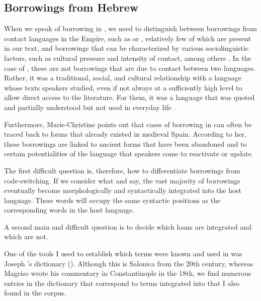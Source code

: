 \documentclass[output=paper,colorlinks,citecolor=brown,babel,arabicfont]{langscibook}
\begin{document}
\subsection{Borrowings from Hebrew}\label{ch3.7.ss.3.1}

When we speak of borrowing in , we need to distinguish between borrowings from contact languages in the  Empire, such as  or , relatively few of which are present in our text, and borrowings that can be characterized by various sociolinguistic factors, such as cultural pressure and intensity of contact, among others \citep[37--39]{winford2003}. In the case of , these are not borrowings that are due to contact between two languages. Rather, it was a traditional, social, and cultural relationship with a language whose texts  speakers studied, even if not always at a sufficiently high level to allow direct access to the literature. For them, it was a language that was quoted and partially understood but not used in everyday life \citep[63]{schwarzwald_rodrigue1981}. 

Furthermore, Marie-Christine \citet[125]{bornes-varol2003} points out that cases of borrowing in  can often be traced back to forms that already existed in medieval Spain. According to her, these borrowings are linked to ancient forms that have been abandoned and to certain potentialities of the language that speakers come to reactivate or update. 


The first difficult question is, therefore, how to differentiate borrowings from code-switching. If we consider what \citet[73]{sankoff_poplack_vanniarajan1990} and \citet[1177--1178]{poplack_sankoff1988} say, the vast majority of borrowings eventually become morphologically and syntactically integrated into the host language. These words will occupy the same syntactic positions as the corresponding words in the host language.  


A second main and difficult question is to decide which loans are integrated and which are not. 

One of the tools I used to establish which terms were known and used in  was Joseph \citeauthor{nehama1997}'s dictionary (\citeyear{nehama1997}). Although this is Salonica  from the 20th century, whereas Magriso wrote his commentary in Constantinople in the 18th, we find numerous entries in the dictionary that correspond to  terms integrated into  that I also found in the corpus. 
\end{document}
